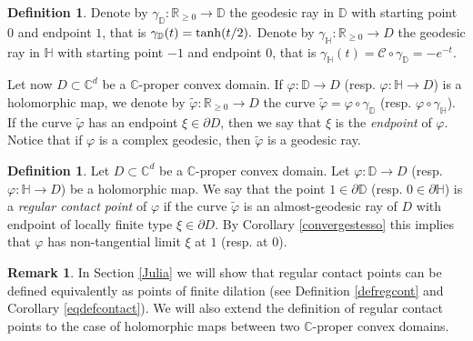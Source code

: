 \documentclass[11pt, reqno]{amsart}
\numberwithin{equation}{section}
\theoremstyle{definition}
\newtheorem{remark}[theorem]{Remark}
\newtheorem{definition}[theorem]{Definition}
\newcommand{\C}{\mathbb{C}}
\newcommand{\D}{\mathbb{D}}
\newcommand{\R}{\mathbb{R}}
\renewcommand{\H}{\mathbb{H}}
\begin{document}
	
	
	
	
	
	
	\begin{definition}
		Denote by $\gamma_\D\colon \R_{\geq 0}\to \D$ the geodesic ray in $\D$ with starting point $0$ and endpoint $1$, that is 
		$\gamma_\D(t)={\rm \tanh} (t/2).$
		Denote by $\gamma_\H\colon \R_{\geq 0}\to D$ the geodesic ray in $\H$ with starting point $-1$ and endpoint $0$,
		that is $\gamma_\H(t)=\mathscr{C}\circ \gamma_\D=-e^{-t}.$
		
		
		Let now $D\subset \C^d$ be a $\C$-proper convex domain.
		If  $\varphi\colon \D\to D$ (resp. $\varphi\colon \H\to D$) is a holomorphic map, we denote by $\tilde \varphi\colon \R_{\geq 0}\to D$ the curve $\tilde \varphi=\varphi\circ \gamma_\D$ (resp. $\varphi\circ \gamma_\H$).
		If the curve $\tilde \varphi$ has an endpoint $\xi\in \partial D$, then we say that $\xi$ is the   {\sl endpoint} of $\varphi$.
		Notice that if $\varphi$ is a complex geodesic, then  $\tilde \varphi$ is a  geodesic ray.
		
		
	\end{definition}
	
	\begin{definition}\label{contacttemp}
		Let $D\subset\C^d$ be a $\C$-proper convex domain. Let $\varphi\colon \D\to D$   (resp. $\varphi\colon \H\to D$)  be a holomorphic map. We say that the point $1\in \partial \D$ (resp. $0\in\partial \H$) is a   {\sl regular contact point} of $\varphi$ 
		if the curve $ \tilde\varphi$ is an almost-geodesic ray of $D$ with endpoint of locally finite type $\xi\in\partial D$.
		By Corollary \ref{convergestesso}  this implies
		that $\varphi$ has non-tangential limit $\xi$ at  $1$ (resp. at 0).
	\end{definition}
	
	\begin{remark}
		In Section \ref{Julia} we will show that  regular contact points  can be defined equivalently as 
		points of finite dilation (see Definition \ref{defregcont} and Corollary \ref{eqdefcontact}). We will also extend the definition of regular contact points  to the case of holomorphic maps between two  $\C$-proper convex domains.
		
	\end{remark}
	
\end{document}
